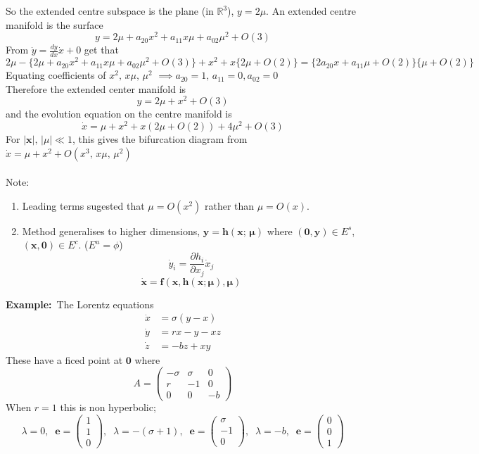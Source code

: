 \documentclass{article}
\newcommand{\example}{\textbf{Example:}}                    %
\newcommand{\bx}{\bm{x}}                                    %
\newcommand{\pder}[2] {\frac{\partial {#1}}{\partial {#2} }}%
\begin{document}
So the extended centre subspace is the plane (in $\mathbb{R}^3$),
$y = 2 \mu$.
An extended centre manifold is the surface
\[ y = 2\mu + a_{20}x^2 + a_{11}x\mu + a_{02}\mu^2 + O(3) \]
From $\displaystyle \dot{y} = \frac{dy}{dx}\dot{x} +0$ get that
\[ 2\mu - \{2\mu + a_{20}x^2 + a_{11}x\mu + a_{02}\mu^2 + O(3)\} + x^2+x\{2\mu +O(2)\}
= \{2a_{20}x + a_{11} \mu +O(2)\}\{\mu + O(2)\}  \]
Equating coefficients of $x^2, \, x\mu , \, \mu^2$ $\implies a_{20} =1, \, 
a_{11} =0, a_{02}=0$
\\
Therefore the extended center manifold is 
\[ y = 2\mu + x^2 +O(3) \]
and the evolution equation on the centre manifold is
\[ \dot{x} = \mu + x^2 + x(2\mu +O(2)) + 4\mu^2 + O(3) \]
For $|\bx| , \, |\mu| \ll 1$, this gives the bifurcation diagram from
$\dot{x} = \mu + x^2 + O(x^3,\, x\mu, \, \mu^2)$
\\
\\
Note:
\begin{enumerate}[1.]
\item Leading terms sugested that $\mu = O(x^2)$ rather than $\mu = O(x)$.
\item Method generalises to higher dimensions,
$\bm{y} = \bm{h}(\bx; \, \bm{\mu})$ where $(\bm{0},\bm{y})\in E^s$, 
$(\bx,\bm{0}) \in E^c$. ($E^u = \phi$)
\[ \dot{y}_i = \pder{h_i}{x_j} \dot{x}_j \]
\[ \dot{\bx} = \bm{f}(\bx, \bm{h}(\bx;\bm{\mu}), \bm{\mu})\]
\end{enumerate}
\noindent \example\ The Lorentz equations
\begin{align*}
\dot{x} &= \sigma(y-x) \\
\dot{y} &= rx - y - xz \\
\dot{z} &= -bz + xy
\end{align*}
These have a ficed point at $\bm{0}$ where
\[ A = \left( \begin{array}{rrr}
-\sigma & \sigma & 0 \\
r & -1 & 0 \\
0 & 0 & -b
\end{array} \right) \]
When $r=1$ this is non hyperbolic;
\[ \lambda=0, \;\;
\bm{e} = \left( \begin{array}{c} 1 \\ 1 \\ 0 \end{array} \right), \;\;
\lambda = -(\sigma +1), \; \;
\bm{e} = \left( \begin{array}{c} \sigma \\ -1 \\ 0 \end{array} \right), \;\;
\lambda = -b, \; \;
\bm{e} = \left( \begin{array}{c} 0 \\ 0 \\ 1 \end{array} \right) \]
\end{document}
